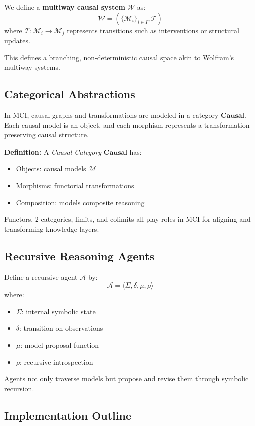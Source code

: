 \documentclass[10pt]{article}
\begin{document}
We define a \textbf{multiway causal system} \( \mathcal{W} \) as:
\[
\mathcal{W} = ( \{ \mathcal{M}_i \}_{i \in I}, \mathcal{T} )
\]
where \( \mathcal{T} : \mathcal{M}_i \rightarrow \mathcal{M}_j \) represents transitions such as interventions or structural updates.

This defines a branching, non-deterministic causal space akin to Wolfram's multiway systems.

\subsection{Categorical Abstractions}

In MCI, causal graphs and transformations are modeled in a category \(
\mathbf{Causal} \). Each causal model is an object, and each morphism
represents a transformation preserving causal structure.

\textbf{Definition:} A \textit{Causal Category} \( \mathbf{Causal} \) has:
\begin{itemize}
    \item Objects: causal models \( \mathcal{M} \)
    \item Morphisms: functorial transformations
    \item Composition: models composite reasoning
\end{itemize}

Functors, 2-categories, limits, and colimits all play roles in MCI for aligning
and transforming knowledge layers.

\subsection{Recursive Reasoning Agents}

Define a recursive agent \( \mathcal{A} \) by:
\[
\mathcal{A} = \langle \Sigma, \delta, \mu, \rho \rangle \]
where:
\begin{itemize}
    \item \( \Sigma \): internal symbolic state
    \item \( \delta \): transition on observations
    \item \( \mu \): model proposal function
    \item \( \rho \): recursive introspection
\end{itemize}

Agents not only traverse models but propose and revise them through symbolic
recursion.

\subsection{Implementation Outline}
\end{document}
